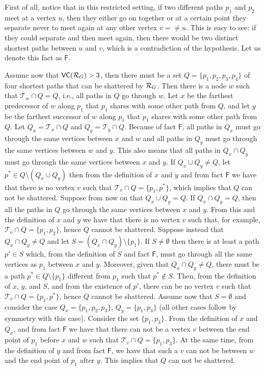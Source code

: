 \begin{IEEEproof}
  First of all, notice that in this restricted setting, if two different paths
  $p_1$ and $p_2$ meet at a vertex $u$, then they either go on together or at a
  certain point they separate never to meet again at any other vertex $v=\neq u$.
  This is easy to see: if they could separate and then meet again, then there
  would be two distinct shortest paths between $u$ and $v$, which is a
  contradiction of the hypothesis. Let us denote this fact as $\mathsf{F}$.

  Assume now that $\mathsf{VC}(\mathcal{R}_G)>3$, then there must be a set
  $Q=\{p_1,p_2,p_3,p_4\}$ of four shortest paths that can be shattered by
  $\mathcal{R}_G$. Then there is a node $w$ such that $\mathcal{T}_w\cap Q=Q$, i.e.,
  all paths in $Q$ go through $w$. Let $x$ be the farthest predecessor of $w$
  along $p_1$ that $p_1$ shares with some other path from $Q$, and let $y$ be
  the farthest successor of $w$ along $p_1$ that $p_1$ shares with some other
  path from $Q$. Let $Q_x=\mathcal{T}_x\cap Q$ and $Q_y=\mathcal{T}_y\cap Q$.
  Because of fact $\mathsf{F}$, all paths in $Q_x$ must go through the same vertices
  between $x$ and $w$ and all paths in $Q_y$ must go through the same vertices
  between $w$ and $y$. This also means that all paths in $Q_x\cap Q_y$ must go
  through the same vertices between $x$ and $y$. If $Q_x\cup Q_y\neq Q$, let
  $p^*\in Q\setminus(Q_x\cup Q_y)$ then from the definition of $x$ and $y$ and
  from fact $\mathsf{F}$ we have that there is no vertex $v$ such that
  $\mathcal{T}_v\cap Q=\{p_1,p^*\}$, which implies that $Q$ can not be
  shattered. Suppose from now on that $Q_x\cup Q_y=Q$.  If $Q_x\cap Q_y=Q$, then
  all the paths in $Q$ go through the same vertices between $x$ and $y$. From
  this and the definition of $x$ and $y$ we have that there is no vertex $v$
  such that, for example, $\mathcal{T}_v\cap Q=\{p_1,p_2\}$, hence $Q$ cannot be
  shattered. Suppose instead that $Q_x\cap Q_y\neq Q$ and let $S=(Q_x\cap
  Q_y)\setminus\{p_1\}$. If $S\neq\emptyset$ then there is at least a path
  $p'\in S$ which, from the definition of $S$ and fact $\mathsf{F}$, must go
  through all the same vertices as $p_1$ between $x$ and $y$. Moreover, given
  that $Q_x\cap Q_y\neq Q$, there must be a path $p^*\in Q\setminus\{p_1\}$
  different from $p_1$ such that $p^*\notin S$. Then, from the definition of
  $x$, $y$, and $S$, and from the existence of $p'$, there can be no vertex $v$
  such that $\mathcal{T}_v\cap Q=\{p_1,p^*\}$, hence $Q$ cannot be shattered.
  Assume now that $S=\emptyset$ and consider the case $Q_x=\{p_1,p_2,p_3\}$,
  $Q_y=\{p_1,p_4\}$ (all other cases follow by symmetry with this case).
  Consider the set $\{p_1,p_3\}$. From the definition of $x$ and $Q_x$, and from
  fact $\mathsf{F}$ we have that there can not be a vertex $v$ between the end
  point of $p_1$ before $x$ and $w$ such that $\mathcal{T}_v\cap Q=\{p_1,p_3\}$.
  At the same time, from the definition of $y$ and from fact $\mathsf{F}$, we
  have that such a $v$ can not be between $w$ and the end point of $p_1$ after
  $y$. This implies that $Q$ can not be shattered.


\end{IEEEproof}
